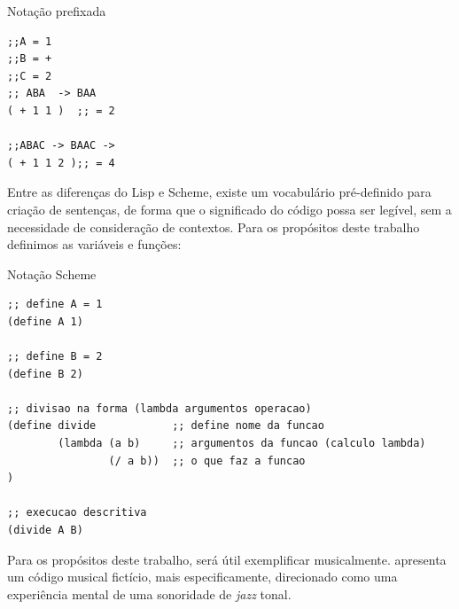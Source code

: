 \begin{example}{Notação prefixada}
\begin{verbatim}
;;A = 1
;;B = +
;;C = 2
;; ABA  -> BAA
( + 1 1 )  ;; = 2

;;ABAC -> BAAC -> 
( + 1 1 2 );; = 4
\end{verbatim}
\end{example}

Entre as diferenças do Lisp e Scheme, existe um vocabulário pré-definido para criação de sentenças, de forma que o significado do código possa ser legível, sem a necessidade de consideração de contextos. Para os propósitos deste trabalho definimos as variáveis e funções:

\begin{example}{Notação Scheme}
\begin{verbatim}
;; define A = 1
(define A 1)

;; define B = 2
(define B 2)

;; divisao na forma (lambda argumentos operacao) 
(define divide            ;; define nome da funcao
        (lambda (a b)     ;; argumentos da funcao (calculo lambda)
                (/ a b))  ;; o que faz a funcao
)

;; execucao descritiva
(divide A B)
\end{verbatim}
\end{example}

Para os propósitos deste trabalho, será útil exemplificar musicalmente.  apresenta um código musical fictício, mais especificamente, direcionado como uma experiência mental de uma sonoridade de \emph{jazz} tonal. 


